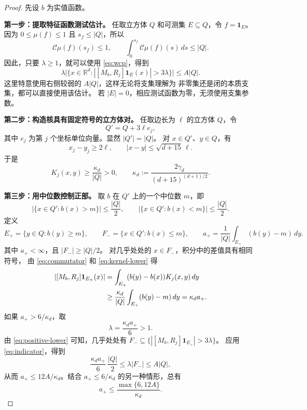 \documentclass[UTF8,fontset=fandol,a4paper,11pt]{ctexart}
\newcommand{\R}{\mathbb R}
\newcommand{\C}{\mathcal C}
\newcommand{\one}{\mathbf 1}
\begin{document}
\begin{proof}
先设 $b$ 为实值函数。

\medskip
\noindent\textbf{第一步：提取特征函数测试估计。}
任取立方体 $Q$ 和可测集 $E\subseteq Q$，令 $f=\one_E$。
因为 $0\le\mu(f)\le1$ 且 $s_f\le|Q|$，所以
\[
 \C\mu(f)(s_f)\le1,
 \qquad
 \int_0^{s_f}\C\mu(f)(s)\,ds\le|Q|.
\]
因此，只要 $\lambda\ge1$，就可以使用 \eqref{eq:wcp}，得到
\begin{equation}\label{eq:indicator}
 \lambda\bigl|\{x\in\R^d:
       |[M_b,R_j]\one_E(x)|>3\lambda\}\bigr|
 \le A|Q|.
\end{equation}
这里特意使用右侧较弱的 $A|Q|$，这样无论将支集理解为
非零集还是闭的本质支集，都可以直接使用该估计。
若 $|E|=0$，相应测试函数为零，无须使用支集参数。

\medskip
\noindent\textbf{第二步：构造核具有固定符号的立方体对。}
任取边长为 $\ell$ 的立方体 $Q$，令
\[
 Q'=Q+3\ell e_j,
\]
其中 $e_j$ 为第 $j$ 个坐标单位向量。显然 $|Q'|=|Q|$。
对 $x\in Q'$、$y\in Q$，有
\[
 x_j-y_j\ge2\ell,
 \qquad |x-y|\le\sqrt{d+15}\,\ell.
\]
于是
\begin{equation}\label{eq:kernel-lower}
 K_j(x,y)\ge\frac{\kappa_d}{|Q|}>0,
 \qquad
 \kappa_d:=\frac{2\gamma_d}{(d+15)^{(d+1)/2}}.
\end{equation}

\medskip
\noindent\textbf{第三步：用中位数控制正部。}
取 $b$ 在 $Q'$ 上的一个中位数 $m$，即
\[
 |\{x\in Q':b(x)>m\}|\le\frac{|Q|}{2},
 \qquad
 |\{x\in Q':b(x)<m\}|\le\frac{|Q|}{2}.
\]
定义
\[
 E_+=\{y\in Q:b(y)\ge m\},
 \qquad F_-=\{x\in Q':b(x)\le m\},
 \qquad
 a_+=\frac1{|Q|}\int_{E_+}(b(y)-m)\,dy.
\]
其中 $a_+<\infty$，且 $|F_-|\ge|Q|/2$。
对几乎处处的 $x\in F_-$，积分中的差值具有相同符号，
由 \eqref{eq:commutator} 和 \eqref{eq:kernel-lower} 得
\begin{align}
 |[M_b,R_j]\one_{E_+}(x)|
 &=\int_{E_+}(b(y)-b(x))K_j(x,y)\,dy \notag\\
 &\ge\frac{\kappa_d}{|Q|}
       \int_{E_+}(b(y)-m)\,dy
 =\kappa_d a_+.
 \label{eq:positive-lower}
\end{align}
如果 $a_+>6/\kappa_d$，取
\[
 \lambda=\frac{\kappa_da_+}{6}>1.
\]
由 \eqref{eq:positive-lower} 可知，几乎处处有
$F_-\subseteq\{|[M_b,R_j]\one_{E_+}|>3\lambda\}$。
应用 \eqref{eq:indicator}，得到
\[
 \frac{\kappa_da_+}{6}\,\frac{|Q|}{2}
 \le\lambda|F_-|\le A|Q|,
\]
从而 $a_+\le12A/\kappa_d$。结合 $a_+\le6/\kappa_d$
的另一种情形，总有
\begin{equation}\label{eq:positive-bound}
 a_+\le\frac{\max\{6,12A\}}{\kappa_d}.
\end{equation}


\end{proof}
\end{document}
